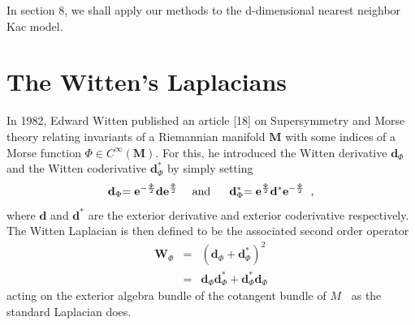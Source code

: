 \documentclass{article}
\begin{document}
In section 8, we shall apply our methods to the d-dimensional nearest
neighbor Kac model.

\section{The Witten's Laplacians}

In 1982, Edward Witten published an article [18] on Supersymmetry and Morse
theory relating invariants of a Riemannian manifold $\mathbf{M}$ with some
indices of a Morse function $\Phi \in C^{\infty }(\mathbf{M}).$ For this, he
introduced the Witten derivative $\mathbf{d}_{\Phi }$ and the Witten
coderivative $\mathbf{d}_{\Phi }^{\ast }$ by simply setting$\;$%
\begin{equation}
\mathbf{d}_{\Phi }\mathbf{=e}^{-\frac{\Phi }{2}}\mathbf{de}^{\frac{\Phi }{2}}%
\mathbf{\;\ \ \ }\text{and}\ \ \ \ \ \mathbf{d}_{\Phi }^{\ast }\mathbf{=e}^{%
\frac{\Phi }{2}}\mathbf{d}^{\ast }\mathbf{e}^{-\frac{\Phi }{2}}\;\;,
\end{equation}%
where $\mathbf{d}$ and $\mathbf{d}^{\ast }$ are the exterior derivative and
exterior coderivative respectively. The Witten Laplacian is then defined to
be the associated second order operator 
\begin{eqnarray}
\mathbf{W}_{\Phi } &=&\left( \mathbf{d}_{\Phi }+\mathbf{d}_{\Phi }^{\ast
}\right) ^{2} \\
&=&\mathbf{d}_{\Phi }\mathbf{d}_{\Phi }^{\ast }+\mathbf{d}_{\Phi }^{\ast }%
\mathbf{d}_{\Phi }
\end{eqnarray}%
acting on the exterior algebra bundle of the cotangent bundle of $M$\textbf{%
\ }as the standard Laplacian does$.$
\end{document}
